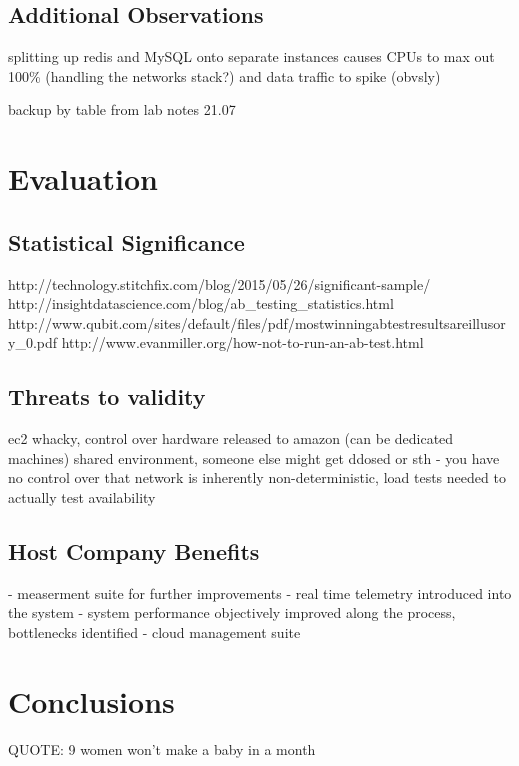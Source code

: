 \documentclass{uvamscse}
\begin{document}
\section{Additional Observations}

splitting up redis and MySQL onto separate instances causes CPUs to max out 100\% (handling the networks stack?) and data traffic to spike (obvsly)

backup by table from lab notes 21.07



\chapter{Evaluation}\label{Evaluation}

\section{Statistical Significance}
http://technology.stitchfix.com/blog/2015/05/26/significant-sample/
http://insightdatascience.com/blog/ab\_testing\_statistics.html
http://www.qubit.com/sites/default/files/pdf/mostwinningabtestresultsareillusory\_0.pdf
http://www.evanmiller.org/how-not-to-run-an-ab-test.html

\section{Threats to validity}
ec2 whacky, control over hardware released to amazon (can be dedicated machines)
shared environment, someone else might get ddosed or sth - you have no control over that
network is inherently non-deterministic, load tests needed to actually test availability

\section{Host Company Benefits}
- measerment suite for further improvements
- real time telemetry introduced into the system
- system performance objectively improved along the process, bottlenecks identified
- cloud management suite

\chapter{Conclusions}\label{Conclusions}
QUOTE: 9 women won't make a baby in a month
\end{document}
